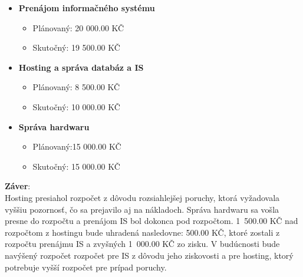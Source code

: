 \documentclass[a4paper, 11pt]{article}
\begin{document}
\begin{itemize}
\item \textbf{Prenájom informačného systému}
\begin{itemize}
\item Plánovaný: 20 000.00 KČ
\item Skutočný: 19 500.00 KČ
\end{itemize}

\item \textbf{Hosting a správa databáz a IS}
\begin{itemize}
\item Plánovaný: 8 500.00 KČ
\item Skutočný: 10 000.00 KČ
\end{itemize}

\item \textbf{Správa hardwaru}
\begin{itemize}
\item Plánovaný:15 000.00 KČ
\item Skutočný: 15 000.00 KČ
\end{itemize}

\end{itemize}
\textbf{Záver}:\\
 Hosting presiahol rozpočet z dôvodu rozsiahlejšej poruchy, ktorá vyžadovala vyššiu pozornosť, čo sa prejavilo aj na nákladoch. Správa hardwaru sa vošla presne do rozpočtu  a prenájom IS bol dokonca pod rozpočtom. 1~500.00 KČ nad rozpočtom z hostingu bude  uhradená nasledovne: 500.00 KČ, ktoré zostali z rozpočtu prenájmu IS a zvyšných 1~000.00 KČ zo zisku. V budúcnosti bude navýšený rozpočet rozpočet pre IS z dôvodu jeho ziskovosti a pre hosting, ktorý potrebuje vyšší rozpočet pre prípad poruchy.
\end{document}
